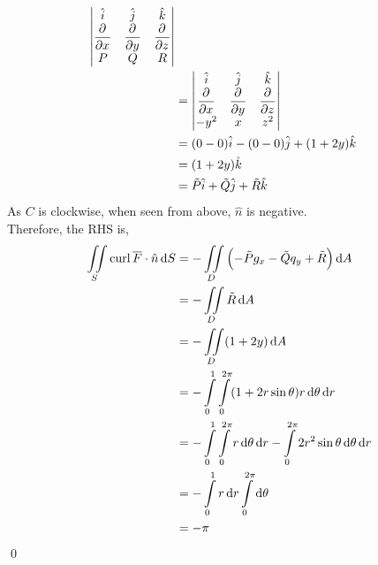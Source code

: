 \documentclass[fleqn, a4paper, 12pt, twoside]{article}
\theoremstyle{definition}
\theoremstyle{theorem}
\newcommand{\curl}{\mathrm{curl\,}}
\begin{document}
{\begin{solution}
\begin{align*}
			\begin{vmatrix}
				\hat{i}   & \hat{j}   & \hat{k}   \\
				\dpd{}{x} & \dpd{}{y} & \dpd{}{z} \\
				P         & Q         & R
			\end{vmatrix}\\
		                   &=
			\begin{vmatrix}
				\hat{i}   & \hat{j}   & \hat{k}   \\
				\dpd{}{x} & \dpd{}{y} & \dpd{}{z} \\
				-y^2      & x         & z^2
			\end{vmatrix}\\
		                   &= (0 - 0) \hat{i} - (0 - 0) \hat{j} + (1 + 2 y) \hat{k}\\
		                   &= (1 + 2 y) \hat{k}\\
		                   &= \tilde{P} \hat{i} + \tilde{Q} \hat{j} + \tilde{R} \hat{k}
	\end{align*}
	As $C$ is clockwise, when seen from above, $\hat{n}$ is negative.\\
	Therefore, the RHS is,
	\begin{align*}
		\iint\limits_{S} \curl \overline{F} \cdot \hat{n} \dif S & = -\iint\limits_{D} \left( -\tilde{P} g_x - \tilde{Q} q_y + \tilde{R} \right) \dif A                                               \\
                                                                         & = -\iint\limits_{D} \tilde{R} \dif A                                                                                               \\
                                                                         & = -\iint\limits_{D} (1 + 2 y) \dif A                                                                                               \\
                                                                         & = -\int\limits_{0}^{1} \int\limits_{0}^{2 \pi} (1 + 2 r \sin \theta) r \dif \theta \dif r                                          \\
                                                                         & = -\int\limits_{0}^{1} \int\limits_{0}^{2 \pi} r \dif \theta \dif r - \int\limits_{0}^{2 \pi} 2 r^2 \sin \theta \dif \theta \dif r \\
                                                                         & = -\int\limits_{0}^{1} r \dif r \int\limits_{0}^{2 \pi} \dif \theta                                                                \\
                                                                         & = -\pi
	\end{align*}
	\qed
\end{solution}

}
\end{document}
